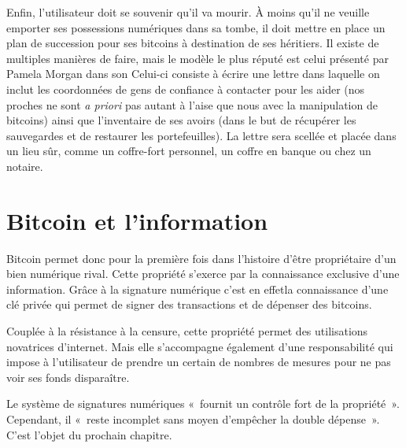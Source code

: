 Enfin, l'utilisateur doit se souvenir qu'il va mourir. À moins qu'il ne veuille emporter ses possessions numériques dans sa tombe, il doit mettre en place un plan de succession pour ses bitcoins à destination de ses héritiers. Il existe de multiples manières de faire, mais le modèle le plus réputé est celui présenté par Pamela Morgan dans son  Celui-ci consiste à écrire une lettre dans laquelle on inclut les coordonnées de gens de confiance à contacter pour les aider (nos proches ne sont \emph{a priori} pas autant à l'aise que nous avec la manipulation de bitcoins) ainsi que l'inventaire de ses avoirs (dans le but de récupérer les sauvegardes et de restaurer les portefeuilles). La lettre sera scellée et placée dans un lieu sûr, comme un coffre-fort personnel, un coffre en banque ou chez un notaire.

\section*{Bitcoin et l'information}

Bitcoin permet donc pour la première fois dans l'histoire d'être propriétaire d'un bien numérique rival. Cette propriété s'exerce par la connaissance exclusive d'une information. Grâce à la signature numérique c'est en effetla connaissance d'une clé privée qui permet de signer des transactions et de dépenser des bitcoins.

Couplée à la résistance à la censure, cette propriété permet des utilisations novatrices d'internet. Mais elle s'accompagne également d'une responsabilité qui impose à l'utilisateur de prendre un certain de nombres de mesures pour ne pas voir ses fonds disparaître.

Le système de signatures numériques «~fournit un contrôle fort de la propriété~». Cependant, il «~reste incomplet sans moyen d'empêcher la double dépense~». C'est l'objet du prochain chapitre.

\printendnotes